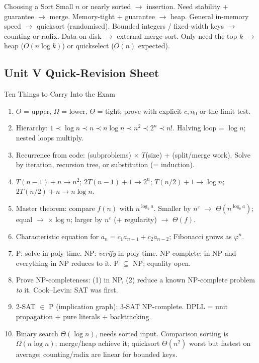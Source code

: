 \documentclass[11pt,a4paper]{article}
\begin{document}
\begin{examtip}{Choosing a Sort}
Small $n$ or nearly sorted $\to$ insertion. Need stability + guarantee $\to$ merge. Memory-tight + guarantee $\to$ heap. General in-memory speed $\to$ quicksort (randomised). Bounded integers / fixed-width keys $\to$ counting or radix. Data on disk $\to$ external merge sort. Only need the top $k$ $\to$ heap ($O(n\log k)$) or quickselect ($O(n)$ expected).
\end{examtip}

\subsection{Unit V Quick-Revision Sheet}

\begin{examtip}{Ten Things to Carry Into the Exam}
\begin{enumerate}
    \item $O$ = upper, $\Omega$ = lower, $\Theta$ = tight; prove with explicit $c, n_0$ or the limit test.
    \item Hierarchy: $1 \prec \log n \prec n \prec n\log n \prec n^2 \prec 2^n \prec n!$. Halving loop = $\log n$; nested loops multiply.
    \item Recurrence from code: (subproblems) $\times$ $T$(size) + (split/merge work). Solve by iteration, recursion tree, or substitution (= induction).
    \item $T(n-1) + n \to n^2$; $2T(n-1) + 1 \to 2^n$; $T(n/2) + 1 \to \log n$; $2T(n/2) + n \to n\log n$.
    \item Master theorem: compare $f(n)$ with $n^{\log_b a}$. Smaller by $n^\varepsilon$ $\to$ $\Theta(n^{\log_b a})$; equal $\to$ $\times \log n$; larger by $n^\varepsilon$ (+ regularity) $\to$ $\Theta(f)$.
    \item Characteristic equation for $a_n = c_1a_{n-1} + c_2a_{n-2}$; Fibonacci grows as $\varphi^n$.
    \item P: solve in poly time. NP: \emph{verify} in poly time. NP-complete: in NP and everything in NP reduces to it. P $\subseteq$ NP; equality open.
    \item Prove NP-completeness: (1) in NP, (2) reduce a known NP-complete problem \emph{to} it. Cook--Levin: SAT was first.
    \item 2-SAT $\in$ P (implication graph); 3-SAT NP-complete. DPLL = unit propagation + pure literals + backtracking.
    \item Binary search $\Theta(\log n)$, needs sorted input. Comparison sorting is $\Omega(n\log n)$; merge/heap achieve it; quicksort $\Theta(n^2)$ worst but fastest on average; counting/radix are linear for bounded keys.
\end{enumerate}
\end{examtip}
\end{document}
